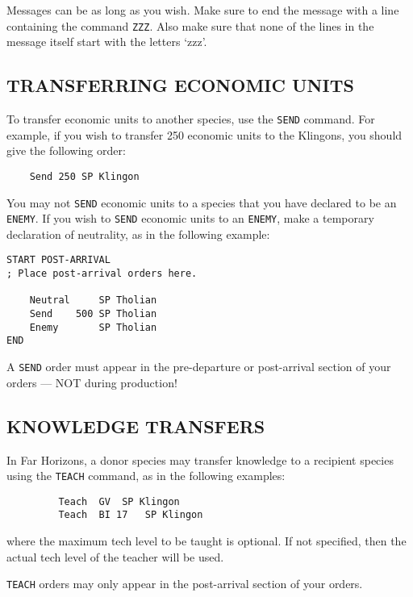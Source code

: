 \documentclass[10pt,titlepage]{article}
\begin{document}
Messages can be as long as you wish.  Make sure to end the message with a line
containing the command \texttt{ZZZ}.  Also make sure that none of the lines in the
message itself start with the letters `zzz'.


\subsection{TRANSFERRING ECONOMIC UNITS}
\label{sec:transferringeconomicunits}


To transfer economic units to another species, use the \texttt{SEND} command.  For
example, if you wish to transfer 250 economic units to the Klingons, you
should give the following order:

\begin{verbatim}
    Send 250 SP Klingon\end{verbatim} 

You may not \texttt{SEND} economic units to a species that you have declared to be an
\texttt{ENEMY}.  If you wish to \texttt{SEND} economic units to an \texttt{ENEMY}, make a temporary
declaration of neutrality, as in the following example:

\begin{verbatim}
START POST-ARRIVAL
; Place post-arrival orders here.

	Neutral		SP Tholian
	Send	500	SP Tholian
	Enemy		SP Tholian
END\end{verbatim} 

A \texttt{SEND} order must appear in the pre-departure or post-arrival section of your
orders --- NOT during production!


\subsection{KNOWLEDGE TRANSFERS}
\label{sec:knowledgetransfers}


In Far Horizons, a donor species may transfer knowledge to a recipient species
using the \texttt{TEACH} command, as in the following examples:

\begin{verbatim}
         Teach	GV	SP Klingon
         Teach	BI 17	SP Klingon
\end{verbatim} 

where the maximum tech level to be taught is optional.  If not specified, then
the actual tech level of the teacher will be used.

\texttt{TEACH} orders may only appear in the post-arrival section of your orders.
\end{document}
